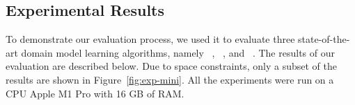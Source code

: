 \subsection{Experimental Results}



To demonstrate our evaluation process, we used it to evaluate three state-of-the-art domain model learning algorithms, namely \samshort~\citep{juba2021safe}, \offlam~\citep{LAMANNA2025104256}, and \nolam~\citep{Lamanna24}. The results of our evaluation are described below. Due to space constraints, only a subset of the results are shown in Figure~\ref{fig:exp-mini}. All the experiments were run on a CPU Apple M1 Pro with 16 GB of RAM.





